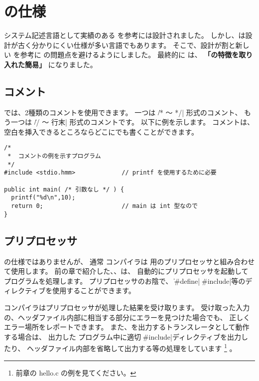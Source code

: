 % 
%
\chapter{\cmml の仕様}

システム記述言語として実績のある \cl を参考に\cmml は設計されました。
しかし、\cl は設計が古く分かりにくい仕様が多い言語でもあります。
そこで、設計が割と新しい \javal を参考に \cl の問題点を避けるようにしました。
最終的に \cmml は、
{\bf 「\javal の特徴を取り入れた簡易\cl」} になりました。

\section{コメント}

\cmml では、2種類のコメントを使用できます。
一つは \|/* 〜 */| 形式のコメント、
もう一つは \|// 〜 行末| 形式のコメントです。
以下に例を示します。
コメントは、空白を挿入できるところならどこにでも書くことができます。

\begin{mylist}
\begin{verbatim}
/*
 *  コメントの例を示すプログラム
 */
#include <stdio.hmm>             // printf を使用するために必要

public int main( /* 引数なし */ ) {
  printf("%d\n",10);
  return 0;                      // main は int 型なので
}
\end{verbatim}
\end{mylist}

\section{プリプロセッサ}

\cmml の仕様ではありませんが、
通常 \cmm コンパイラは \cl 用のプリプロセッサと組み合わせて使用します。
前の章で紹介した{\cme}、{\cmc}、{\cmv}は、
自動的にプリプロセッサを起動して{\cmm}プログラムを処理します。
プリプロセッサのお陰で、
\|#define|、\|#include|等のディレクティブを使用することができます。

\cmm コンパイラはプリプロセッサが処理した結果を受け取ります。
受け取った入力の、ヘッダファイル内部に相当する部分にエラーを見つけた場合でも、
正しくエラー場所をレポートできます。
また、\cl を出力するトランスレータとして動作する場合は、
出力した \cl プログラム中に適切な\|#include|ディレクティブを出力したり、
ヘッダファイル内部を省略して出力する等の処理をしています
\footnote{前章の hello.c の例を見てください。}
。

